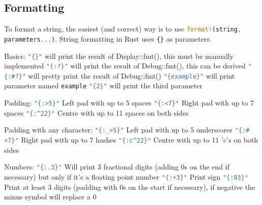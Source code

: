 \documentclass[a4paper,11pt]{article}
\begin{document}
\medskip
\medskip

\subsection{Formatting}

To format a string, the easiest (and correct) way is to use \lstinline[language=Rust]{format!(string, parameters...)}. String formatting in Rust uses \lstinline|{}| as parameters. 
\newline

Basics:
\newline
\lstinline[language=Rust]|"{}"| will print the result of Display::fmt(), this must be manually implemented
\newline
\lstinline[language=Rust]|"{:?}"| will print the result of Debug::fmt(), this can be derived
\newline
\lstinline[language=Rust]|"{:#?}"| will pretty print the result of Debug::fmt()
\newline
\lstinline[language=Rust]|"{example}"| will print parameter named \lstinline|example|
\newline
\lstinline[language=Rust]|"{2}"| will print the third parameter
\newline

Padding:
\newline
\lstinline[language=Rust]|"{:>5}"| Left pad with up to 5 spaces
\newline
\lstinline[language=Rust]|"{:<7}"| Right pad with up to 7 spaces
\newline
\lstinline[language=Rust]|"{:^22}"| Centre with up to 11 spaces on both sides
\newline

Padding with any character:
\newline
\lstinline[language=Rust]|"{:_>5}"| Left pad with up to 5 underscores
\newline
\lstinline[language=Rust]|"{:#<7}"| Right pad with up to 7 hashes
\newline
\lstinline[language=Rust]|"{:c^22}"| Centre with up to 11 'c's on both sides
\newline

Numbers:
\newline
\lstinline[language=Rust]|"{:.3}"| Will print 3 fractional digits (adding 0s on the end if necessary) but only if it's a floating point number
\newline
\lstinline[language=Rust]|"{:+3}"| Print sign 
\newline
\lstinline[language=Rust]|"{:03}"| Print at least 3 digits (padding with 0s on the start if necessary), if negative the minus symbol will replace a 0
\newline
\end{document}
